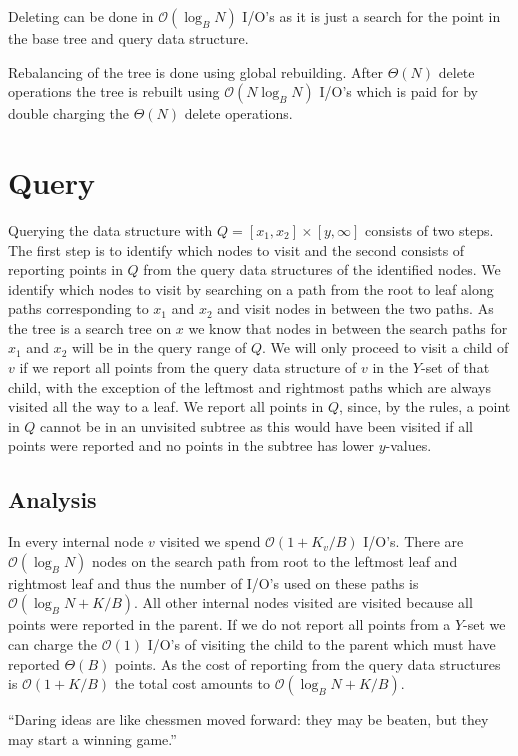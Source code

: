 \documentclass[twoside,11pt,openright]{report}
\begin{document}
Deleting can be done in $\mathcal{O}(\log_B N)$ I/O's as it is just a search for the point in the base tree and query data structure.

Rebalancing of the tree is done using global rebuilding. After $\Theta(N)$ delete operations the tree is rebuilt using $\mathcal{O}(N \log_B N)$ I/O's which is paid for by double charging the $\Theta(N)$ delete operations.
\section{Query}
\label{sec:arge_query}
Querying the data structure with $Q = \left[ x_1, x_2 \right] \times \left[ y, \infty \right]$ consists of two steps. The first step is to identify which nodes to visit and the second consists of reporting points in $Q$ from the query data structures of the identified nodes. 
We identify which nodes to visit by searching on a path from the root to leaf along paths corresponding to $x_1$ and $x_2$ and visit nodes in between the two paths. As the tree is a search tree on $x$ we know that nodes in between the search paths for $x_1$ and $x_2$ will be in the query range of $Q$.
We will only proceed to visit a child of $v$ if we report all points from the query data structure of $v$ in the $Y$-set of that child, with the exception of the leftmost and rightmost paths which are always visited all the way to a leaf.
We report all points in $Q$, since, by the rules, a point in $Q$ cannot be in an unvisited subtree as this would have been visited if all points were reported and no points in the subtree has lower $y$-values.

\subsection{Analysis}
In every internal node $v$ visited we spend $\mathcal{O}(1+K_v/B)$ I/O's. There are $\mathcal{O}(\log_B N)$ nodes on the search path from root to the leftmost leaf and rightmost leaf and thus the number of I/O's used on these paths is $\mathcal{O}(\log_B N + K/B)$. All other internal nodes visited are visited because all points were reported in the parent. If we do not report all points from a $Y$-set we can charge the $\mathcal{O}(1)$ I/O's of visiting the child to the parent which must have reported $\Theta(B)$ points. As the cost of reporting from the query data structures is $\mathcal{O}(1+K/B)$ the total cost amounts to $\mathcal{O}(\log_B N + K/B)$.


\begin{savequote}[0.50\textwidth]
``Daring ideas are like chessmen moved forward: they may be beaten, but they may start a winning game.''
\end{savequote}
\end{document}
